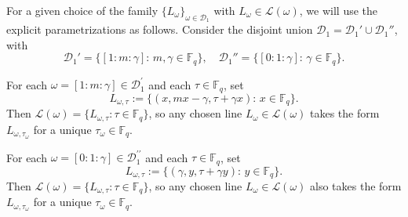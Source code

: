\documentclass[11pt]{article}
\newcommand{\F}{\mathbb{F}}
\newcommand{\cD}{\mathcal{D}}
\newcommand{\cL}{\mathcal{L}}
\newcommand{\1}{\mathbf 1}
\newcommand{\Fq}{\mathbb{F}_q}
\begin{document}
For a given choice of the family $\{L_\omega\}_{\omega\in \cD_1}$ with $L_\omega\in \cL(\omega)$, we will use the explicit parametrizations as follows. Consider the disjoint union $\cD_1=\cD_1'\cup \cD_1''$, with 
\[
\cD_1'=\{[1:m:\gamma]:\, m,\gamma \in \Fq\},\quad \cD_1''=\{[0:1:\gamma]:\, \gamma \in \Fq\}.
\]
{ 
For each $\omega=[1:m:\gamma]\in \cD_1^{\prime}$ and each $\tau\in \F_q$, set
\begin{equation} \label{eq_q_lines_1}
L_{\omega,\tau}:=\{(x,mx-\gamma,\tau+\gamma x):\, x\in\Fq\}. 
\end{equation}
Then $\cL(\omega)=\{L_{\omega,\tau}: \tau \in \F_q\}$, so any chosen line $L_\omega \in \cL(\omega)$ takes the form $L_{\omega, \tau_\omega}$ for a unique $\tau_\omega \in \F_q$.

For each $\omega=[0:1:\gamma]\in \cD_1^{\prime\prime}$ and each $\tau\in\F_q$, set
\begin{equation} \label{eq_q_lines_2}
L_{\omega,\tau}:=\{(\gamma,y,\tau+\gamma y):\, y\in\Fq\}. 
\end{equation}
Then $\cL(\omega)=\{L_{\omega,\tau}: \tau\in\F_q\}$, so any chosen line $L_\omega\in\cL(\omega)$ also takes the form $L_{\omega,\tau_\omega}$ for a unique $\tau_\omega\in\F_q$.
}
\end{document}
